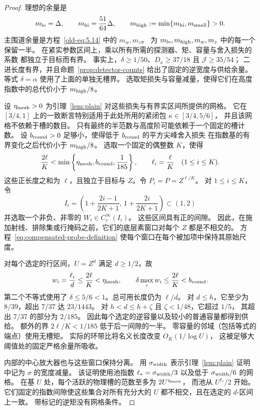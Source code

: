 \documentclass[11pt,a4paper]{article}
\numberwithin{equation}{section}
\numberwithin{figure}{section}
\theoremstyle{definition}
\theoremstyle{remark}
\begin{document}
\begin{proof}
理想的余量是
\[
 m_{\rm lo}=\Delta,\qquad m_{\rm hi}=\frac{51}{64}\Delta,\qquad
 m_{\rm high}:=\min\{m_{\rm hi},m_{\rm small}\}>0.
\]
主围道余量是方程~\eqref{old-eq:5.14} 中的 \(m_w,m_z\)。
为 \(m_{\rm lo},m_{\rm high},m_w,m_z\) 中的每一个保留一半。
在紧实参数区间上，乘以所有所需的探测器、矩、容量与舍入损失的系数
都独立于目标而有界。
事实上，\(\delta\ge1/50\)、\(D_x\ge37/18\) 且 \(\mathcal J\ge35/54\)；
二进长度有界，并且命题~\ref{prop:detector-counts} 给出了固定的逆宽度与供给余量。
等式 \(\delta=\alpha\) 使用了上面的单独无槽界。
选取矩损失与容量减量，使得它们在高度指数中的总代价小于 \(m_{\rm high}/8\)。

设 \(\eta_{\rm mesh}>0\) 为引理~\ref{lem:plain} 对这些损失与有界实区间所提供的网格。
它在 \([3/4,1]\) 上的一致断言特别适用于此处所用的紧闭包 \(\kappa\in[3/4,5/6]\)，
并且该网格不依赖于槽的数目。
只有最终的半范数与高度阶可能依赖于一个固定的槽计数。
设 \(b_{\rm round}>0\) 足够小，使得低于 \(b_{\rm round}\) 的平方尖峰舍入损失
在指数基的有界变化之后代价小于 \(m_{\rm high}/8\)。
选取一个固定的偶整数 \(K\)，使得
\[
 \frac{2\ell}{K}<
 \min\left\{\eta_{\rm mesh},b_{\rm round},\frac1{185}\right\},
 \qquad \ell_i=\frac{\ell}{K}\quad(1\le i\le K).
\]
这些正长度之和为 \(\ell\)，且独立于目标与 \(Z\)。令 \(P_i=P=Z^{\ell/K}\)。
对 \(1\le i\le K\)，令
\[
 I_i=\left(1+\frac{2i-1}{2K+1},\,1+\frac{2i}{2K+1}\right)\subset(1,2)
\]
并选取一个非负、非零的 \(W_i\in C_c^\infty(I_i)\)。
这些区间具有正的间隙。
因此，在施加射线、排除集或行掩码之前，它们的底层素窗口对每个 \(Z\) 都是不相交的。
方程~\eqref{eq:compensated-probe-definition} 使每个窗口在每个被加项中保持其原始尺度。

对每个选定的行区间，\(U=Z^d\) 满足 \(d\ge1/2\)，故
\[
 w_i=\frac{\ell_i}{d}\le\frac{2\ell}{K}<\eta_{\rm mesh},
 \qquad
 \delta\max_iw_i\le\frac{2\ell}{K}<b_{\rm round}.
\]
第二个不等式使用了 \(\delta\le5/6<1\)。总可用长度仍为 \(\ell/d\)。
对 \(d\le h\)，它至少为 \(8/39\)，超出 \(7/37\) 达 \(23/1443\)。
对 \(h<d\le h+\zeta\) 且 \(\zeta<1/48\)，它超过 \(1/5\)，
其超出 \(7/37\) 的部分为 \(2/185\)。
因此每个选定的逆容量以及较小的普通容量都得到供给。
额外的界 \(2\ell/K<1/185\) 低于后一间隙的一半。
零容量的邻域（包括等式的端点）使用无槽矩。
实际的环带比将名义长度改变 \(O_K(1/\log U)\)，
这被足够大阈值处的固定严格余量所吸收。

内部的中心放大器也与这些窗口保持分离。
用 \(\sigma_{\rm width}\) 表示引理~\ref{lem:plain} 证明中记为 \(\sigma\) 的宽度减量。
该证明使用池指数 \(\ell_*=\sigma_{\rm width}/3\) 以及低于 \(\sigma_{\rm width}/6\) 的网格。
在基 \(U\) 处，每个活跃的物理槽的范数至多为 \(2U^{\eta_{\rm mesh}}\)，
而池从 \(U^{\ell_*}/2\) 开始。
它们固定的指数间隙使这些集合对所有充分大的 \(U\) 都不相交，且在选定的 \(d\)-区间上一致。
带标记的逆矩没有网格条件。


\end{proof}
\end{document}
